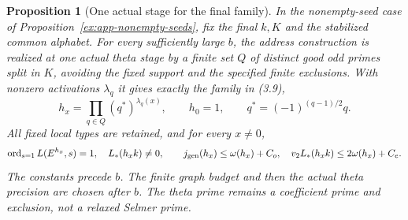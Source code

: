 \documentclass[11pt]{article}
\newtheorem{proposition}[theorem]{Proposition}
\theoremstyle{definition}
\theoremstyle{remark}
\begin{document}
\begin{proposition}[One actual stage for the final family]\label{ex:app-final-family}
In the nonempty-seed case of Proposition~\ref{ex:app-nonempty-seeds},
fix the final $k,K$ and the stabilized common alphabet. For every
sufficiently large $b$, the address construction is realized at one
actual theta stage by a finite set $Q$ of distinct good odd primes
split in $K$, avoiding the fixed support and the specified finite
exclusions. With nonzero activations $\lambda_q$ it gives exactly
the family in (3.9),
\[
 h_x=\prod_{q\in Q}(q^*)^{\lambda_q(x)},\qquad h_0=1,
 \qquad q^*=(-1)^{(q-1)/2}q.
\]
All fixed local types are retained, and for every $x\ne0$,
\[
 \operatorname{ord}_{s=1}L(E^{h_x},s)=1,\quad L_*(h_xk)\ne0,
 \qquad j_{\rm gen}(h_x)\le\omega(h_x)+C_o,\quad
 v_2L_*(h_xk)\le2\omega(h_x)+C_e.
\]
The constants precede $b$. The finite graph budget and then the
actual theta precision are chosen after $b$. The theta prime remains
a coefficient prime and exclusion, not a relaxed Selmer prime.
\end{proposition}
\end{document}
